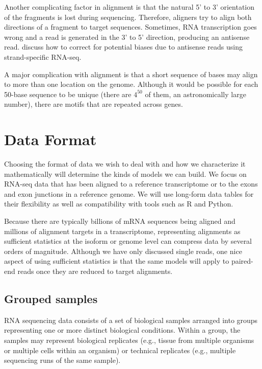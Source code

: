 \documentclass[11pt]{report}
\begin{document}
Another complicating factor in alignment is that the natural 5' to 3'
orientation of the fragments is lost during sequencing. Therefore,
aligners try to align both directions of a fragment to target
sequences. Sometimes, RNA transcription goes wrong and a read is
generated in the 3' to 5' direction, producing an antisense read.
\cite{mourao2019detection} discuss how to correct for potential biases
due to antisense reads using strand-specific RNA-seq.

A major complication with alignment is that a short sequence of bases
may align to more than one location on the genome. Although it would
be possible for each 50-base sequence to be unique (there are $4^{50}$
of them, an astronomically large number), there are motifs that are
repeated across genes.


\chapter{Data Format}

Choosing the format of data we wish to deal with and how we
characterize it mathematically will determine the kinds of models we
can build. We focus on RNA-seq data that has been aligned to a
reference transcriptome or to the exons and exon junctions in a
reference genome. We will use long-form data tables for their
flexibility as well as compatibility with tools such as R and Python.

Because there are typically billions of mRNA sequences being aligned
and millions of alignment targets in a transcriptome, representing
alignments as sufficient statistics at the isoform or genome level can
compress data by several orders of magnitude. Although we have only
discussed single reads, one nice aspect of using sufficient statistics
is that the same models will apply to paired-end reads once they are
reduced to target alignments.


\section{Grouped samples}

RNA sequencing data consists of a set of biological samples arranged
into groups representing one or more distinct biological conditions.
Within a group, the samples may represent biological replicates (e.g.,
tissue from multiple organisms or multiple cells within an organism)
or technical replicates (e.g., multiple sequencing runs of the same
sample).
\end{document}
